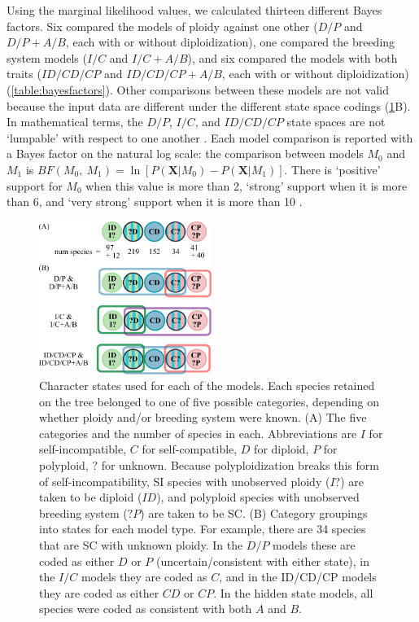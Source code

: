 Using the marginal likelihood values, we calculated thirteen different Bayes factors.
Six compared the models of ploidy against one other ($D/P$ and $D/P+A/B$, each with or without diploidization), one compared the breeding system models ($I/C$ and $I/C+A/B$), and six compared the models with both traits ($ID/CD/CP$ and $ID/CD/CP+A/B$, each with or without diploidization) (\cref{table:bayesfactors}).
%
Other comparisons between these models are not valid because the input data are different under the different state space codings (\cref{figure:stateclassifications}B).
In mathematical terms, the $D/P$, $I/C$, and $ID/CD/CP$ state spaces are not `lumpable' with respect to one another \citep{tarasov_2019}. %
Each model comparison is reported with a Bayes factor on the natural log scale: the comparison between models $M_0$ and $M_1$ is $BF(M_0,\ M_1) = \ln[ P(\mathbf{X} | M_0) - P(\mathbf{X} | M_1)]$.
There is `positive' support for $M_0$ when this value is more than 2, `strong' support when it is more than 6, and `very strong' support when it is more than 10 \citep{kass1995}.

\begin{figure}
\centering
\includegraphics[width=0.5\textwidth]{states} %
\caption{
Character states used for each of the models.
Each species retained on the tree belonged to one of five possible categories, depending on whether ploidy and/or breeding system were known.
(A) The five categories and the number of species in each.
Abbreviations are $I$ for self-incompatible, $C$ for self-compatible, $D$ for diploid, $P$ for polyploid, $?$ for unknown.
Because polyploidization breaks this form of self-incompatibility, SI species with unobserved ploidy ($I?$) are taken to be diploid ($ID$), and polyploid species with unobserved breeding system ($?P$) are taken to be SC.
(B) Category groupings into states for each model type.
For example, there are 34 species that are SC with unknown ploidy. %
In the $D/P$ models these are coded as either $D$ or $P$ (uncertain/consistent with either state), in the $I/C$ models they are coded as $C$, and in the ID/CD/CP models they are coded as either $CD$ or $CP$.
In the hidden state models, all species were coded as consistent with both $A$ and $B$.
}
\label{figure:stateclassifications}
\end{figure}


